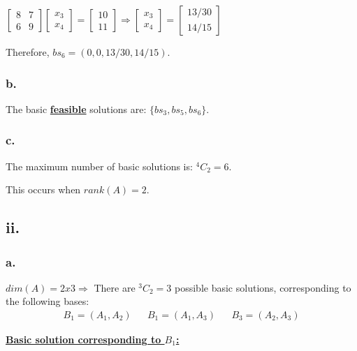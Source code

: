 \documentclass{article}
\begin{document}
\noindent
\newline
$
\begin{bmatrix}
  8 & 7 \\
  6 & 9
\end{bmatrix}
\begin{bmatrix}
  x_3 \\
  x_4
\end{bmatrix}
=
\begin{bmatrix}
 10 \\
 11 
\end{bmatrix}
\Rightarrow
\begin{bmatrix}
  x_3 \\
  x_4
\end{bmatrix}
=
\begin{bmatrix}
  13/30 \\
  14/15
\end{bmatrix}
$
\newline

\noindent
Therefore, $bs_6 = (0, 0, 13/30, 14/15)$.

\subsubsection*{b.}
The basic \textbf{\underline{feasible}} solutions are: $\{bs_3, bs_5, bs_6\}$.

\subsubsection*{c.}
The maximum number of basic solutions is: $^4C_2 = 6$.

\noindent
This occurs when $rank(A) = 2$.

\subsection*{ii.}
\subsubsection*{a.}

$dim(A) = 2x3 \Rightarrow$ There are $^3C_2=3$ possible basic solutions, corresponding to the following bases:
\begin{align*}
  B_1 = (A_1, A_2) && B_1 = (A_1, A_3) && B_3 = (A_2, A_3)
\end{align*}

\noindent
\textbf{\underline{Basic solution corresponding to $B_1$:}}
\end{document}
